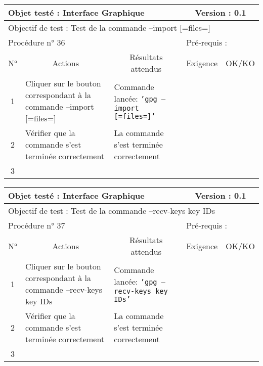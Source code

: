 \documentclass{../res/univ-projet}
\begin{document}
\begin{center}
\begin{tabular}{|c|p{5cm}|p{5cm}|p{1.5cm}|p{1.5cm}|}
\hline
\multicolumn{3}{|l|}{Objet testé : Interface Graphique} & \multicolumn{2}{c|}{Version : 0.1}\\ \hline
\multicolumn{5}{|l|}{Objectif de test : Test de la commande –import [=files=]}\\ \hline
\multicolumn{3}{|l|}{Procédure n° 36} & \multicolumn{2}{p{3cm}|}{Pré-requis : }\\ \hline
\multicolumn{1}{|c|}{N°} & \multicolumn{1}{c|}{Actions} & \multicolumn{1}{c|}{Résultats attendus} & 
\multicolumn{1}{c|}{Exigence} & \multicolumn{1}{c|}{OK/KO}\\ \hline
1 & Cliquer sur le bouton correspondant à la commande –import [=files=] & Commande lancée: \texttt{'gpg –import [=files=]'} &  & \\
2 & Vérifier que la commande s'est terminée correctement & La commande s'est terminée correctement &  & \\
3 &  &  &  & \\ \hline
\end{tabular}
\vskip 2.2cm


\begin{tabular}{|c|p{5cm}|p{5cm}|p{1.5cm}|p{1.5cm}|}
\hline
\multicolumn{3}{|l|}{Objet testé : Interface Graphique} & \multicolumn{2}{c|}{Version : 0.1}\\ \hline
\multicolumn{5}{|l|}{Objectif de test : Test de la commande –recv-keys key IDs}\\ \hline
\multicolumn{3}{|l|}{Procédure n° 37} & \multicolumn{2}{p{3cm}|}{Pré-requis : }\\ \hline
\multicolumn{1}{|c|}{N°} & \multicolumn{1}{c|}{Actions} & \multicolumn{1}{c|}{Résultats attendus} & 
\multicolumn{1}{c|}{Exigence} & \multicolumn{1}{c|}{OK/KO}\\ \hline
1 & Cliquer sur le bouton correspondant à la commande –recv-keys key IDs & Commande lancée: \texttt{'gpg –recv-keys key IDs'} &  & \\
2 & Vérifier que la commande s'est terminée correctement & La commande s'est terminée correctement &  & \\
3 &  &  &  & \\ \hline
\end{tabular}
\vskip 2.2cm



\end{center}
\end{document}
